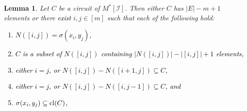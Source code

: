 \documentclass[11pt]{amsart}
\newtheorem{lemma}[theorem]{Lemma}
\newcommand{\cl}{{\rm cl}}
\newcommand{\bloo}{\textcolor{black}}
\begin{document}

\begin{lemma}
\label{circuits}
Let $C$ be a circuit of $M^*[\mathscr I]$. Then either $C$ has $|E|-m+1$ elements or there \bloo{exist} $i, j\in [m]$ such that each of the following hold:
\bloo{\begin{enumerate}[{\rm (i)}]
\item $N([i, j]) = \sigma(x_i, y_j)$,
\item $C$ is a subset of $N([i, j])$ containing $|N([i, j])|-|[i,j]|+1$ elements,
\item either $i = j$, or $N([i, j])-N([i+1, j]) \subseteq C$,
\item either $i = j$, or $N([i, j])-N([i, j-1]) \subseteq C$, and
\item $\sigma(x_i, y_j) \subseteq \cl(C)$,
\end{enumerate}}
\end{lemma}
\end{document}
